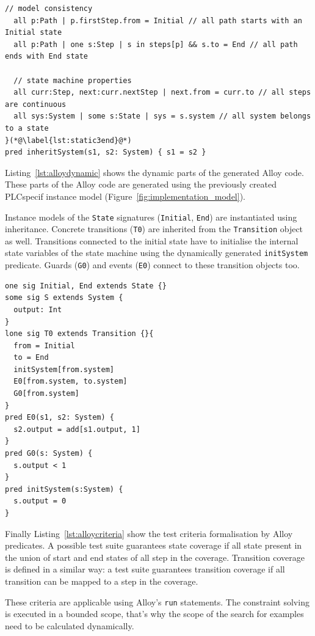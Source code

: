 \begin{description}
\begin{lstlisting}[label={lst:alloystatic}, caption=Static parts of the generated Alloy code,breaklines=true]
  // model consistency
  all p:Path | p.firstStep.from = Initial // all path starts with an Initial state
  all p:Path | one s:Step | s in steps[p] && s.to = End // all path ends with End state
	
  // state machine properties
  all curr:Step, next:curr.nextStep | next.from = curr.to // all steps are continuous
  all sys:System | some s:State | sys = s.system // all system belongs to a state
}(*@\label{lst:static3end}@*)
pred inheritSystem(s1, s2: System) { s1 = s2 }
\end{lstlisting}

Listing~\ref{lst:alloydynamic} shows the dynamic parts of the generated Alloy code. These parts of the Alloy code are generated using the previously created PLCspecif instance model (Figure~\ref{fig:implementation_model}).

Instance models of the \texttt{State} signatures (\texttt{Initial}, \texttt{End}) are instantiated using inheritance. Concrete transitions (\texttt{T0}) are inherited from the \texttt{Transition} object as well. Transitions connected to the initial state have to initialise the internal state variables of the state machine using the dynamically generated \texttt{initSystem} predicate. Guards (\texttt{G0}) and events (\texttt{E0}) connect to these transition objects too.

\begin{lstlisting}[label={lst:alloydynamic}, caption=Dynamic parts of the generated Alloy code,breaklines=true]
one sig Initial, End extends State {}
some sig S extends System {
  output: Int
}
lone sig T0 extends Transition {}{
  from = Initial
  to = End
  initSystem[from.system]
  E0[from.system, to.system]
  G0[from.system]
}
pred E0(s1, s2: System) {
  s2.output = add[s1.output, 1]	
}
pred G0(s: System) {
  s.output < 1
}
pred initSystem(s:System) {
  s.output = 0
}
\end{lstlisting}

Finally Listing~\ref{lst:alloycriteria} show the test criteria formalisation by Alloy predicates. A possible test suite guarantees state coverage if all state present in the union of start and end states of all step in the coverage. Transition coverage is defined in a similar way: a test suite guarantees transition coverage if all transition can be mapped to a step in the coverage.

These criteria are applicable using Alloy's \texttt{run} statements. The constraint solving is executed in a bounded scope, that's why the scope of the search for examples need to be calculated dynamically.


\end{description}
